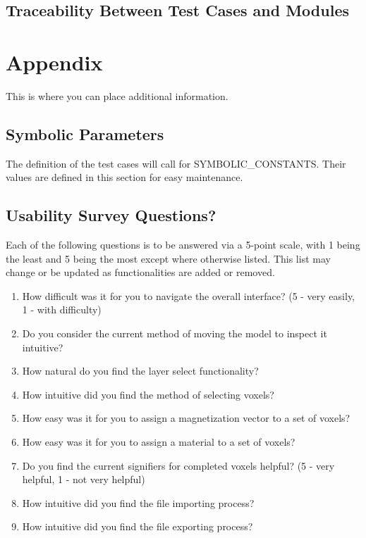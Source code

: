 \documentclass[12pt, titlepage]{article}
\begin{document}
\subsection{Traceability Between Test Cases and Modules}

				




\newpage

\section{Appendix}

This is where you can place additional information.

\subsection{Symbolic Parameters}

The definition of the test cases will call for SYMBOLIC\_CONSTANTS.
Their values are defined in this section for easy maintenance.

\subsection{Usability Survey Questions?}

\iffalse
\wss{This is a section that would be appropriate for some projects.}
\fi

Each of the following questions is to be answered via a 5-point scale, with 1 being the least and 5 being 
the most except where otherwise listed.
This list may change or be updated as functionalities are added or removed.

\begin{enumerate}
  \item How difficult was it for you to navigate the overall interface? (5 - very easily, 1 - with difficulty)
  \item Do you consider the current method of moving the model to inspect it intuitive?
  \item How natural do you find the layer select functionality?
  \item How intuitive did you find the method of selecting voxels?
  \item How easy was it for you to assign a magnetization vector to a set of voxels?
  \item How easy was it for you to assign a material to a set of voxels?
  \item Do you find the current signifiers for completed voxels helpful? (5 - very helpful, 1 - not very helpful)
  \item How intuitive did you find the file importing process?
  \item How intuitive did you find the file exporting process?
\end{enumerate}
\end{document}
